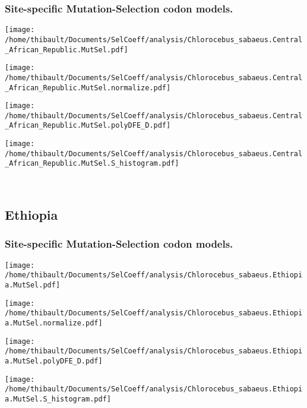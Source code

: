\subsubsection*{Site-specific Mutation-Selection codon models.} 
\begin{minipage}{0.49\linewidth} 
\texttt{[image: /home/thibault/Documents/SelCoeff/analysis/Chlorocebus\_sabaeus.Central\_African\_Republic.MutSel.pdf]} 
\end{minipage}
\begin{minipage}{0.49\linewidth} 
\texttt{[image: /home/thibault/Documents/SelCoeff/analysis/Chlorocebus\_sabaeus.Central\_African\_Republic.MutSel.normalize.pdf]} 
\end{minipage}
\begin{minipage}{0.49\linewidth} 
\texttt{[image: /home/thibault/Documents/SelCoeff/analysis/Chlorocebus\_sabaeus.Central\_African\_Republic.MutSel.polyDFE\_D.pdf]} 
\end{minipage}
\begin{minipage}{0.49\linewidth} 
\texttt{[image: /home/thibault/Documents/SelCoeff/analysis/Chlorocebus\_sabaeus.Central\_African\_Republic.MutSel.S\_histogram.pdf]} 
\end{minipage}
\\ 
\subsection{Ethiopia} 
 
\subsubsection*{Site-specific Mutation-Selection codon models.} 
\begin{minipage}{0.49\linewidth} 
\texttt{[image: /home/thibault/Documents/SelCoeff/analysis/Chlorocebus\_sabaeus.Ethiopia.MutSel.pdf]} 
\end{minipage}
\begin{minipage}{0.49\linewidth} 
\texttt{[image: /home/thibault/Documents/SelCoeff/analysis/Chlorocebus\_sabaeus.Ethiopia.MutSel.normalize.pdf]} 
\end{minipage}
\begin{minipage}{0.49\linewidth} 
\texttt{[image: /home/thibault/Documents/SelCoeff/analysis/Chlorocebus\_sabaeus.Ethiopia.MutSel.polyDFE\_D.pdf]} 
\end{minipage}
\begin{minipage}{0.49\linewidth} 
\texttt{[image: /home/thibault/Documents/SelCoeff/analysis/Chlorocebus\_sabaeus.Ethiopia.MutSel.S\_histogram.pdf]} 
\end{minipage}
\\ 
